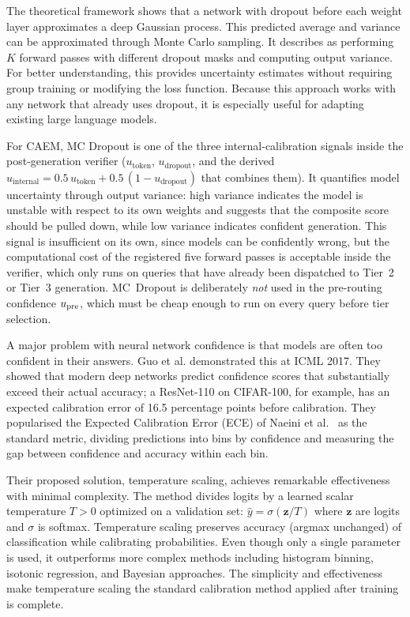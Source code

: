The theoretical framework shows that a network with dropout before each weight layer approximates a deep Gaussian process. This predicted average and variance can be approximated through Monte Carlo sampling. It describes as performing $K$ forward passes with different dropout masks and computing output variance. For better understanding, this provides uncertainty estimates without requiring group training or modifying the loss function. Because this approach works with any network that already uses dropout, it is especially useful for adapting existing large language models.

For CAEM, MC Dropout is one of the three internal-calibration signals inside the post-generation verifier ($u_{\text{token}}$, $u_{\text{dropout}}$, and the derived $u_{\text{internal}} = 0.5\,u_{\text{token}} + 0.5\,(1 - u_{\text{dropout}})$ that combines them). It quantifies model uncertainty through output variance: high variance indicates the model is unstable with respect to its own weights and suggests that the composite score should be pulled down, while low variance indicates confident generation. This signal is insufficient on its own, since models can be confidently wrong, but the computational cost of the registered five forward passes is acceptable inside the verifier, which only runs on queries that have already been dispatched to Tier~2 or Tier~3 generation. MC~Dropout is deliberately \textit{not} used in the pre-routing confidence $u_{\text{pre}}$, which must be cheap enough to run on every query before tier selection.

A major problem with neural network confidence is that models are often too confident in their answers. Guo et al. \cite{pmlr-v70-guo17a} demonstrated this at ICML 2017. They showed that modern deep networks predict confidence scores that substantially exceed their actual accuracy; a ResNet-110 on CIFAR-100, for example, has an expected calibration error of 16.5 percentage points before calibration. They popularised the Expected Calibration Error (ECE) of Naeini et al.~\cite{naeini2015obtaining} as the standard metric, dividing predictions into bins by confidence and measuring the gap between confidence and accuracy within each bin.

Their proposed solution, temperature scaling, achieves remarkable effectiveness with minimal complexity. The method divides logits by a learned scalar temperature $T > 0$ optimized on a validation set: $\hat{y} = \sigma(\mathbf{z}/T)$ where $\mathbf{z}$ are logits and $\sigma$ is softmax. Temperature scaling preserves accuracy (argmax unchanged) of classification while calibrating probabilities. Even though only a single parameter is used, it outperforms more complex methods including histogram binning, isotonic regression, and Bayesian approaches. The simplicity and effectiveness make temperature scaling the standard calibration method applied after training is complete.

